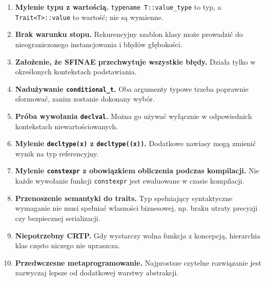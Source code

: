 \begin{enumerate}
\item \textbf{Mylenie typu z wartością.} \texttt{typename T::value\_type}
      to typ, a \texttt{Trait<T>::value} to wartość; nie są wymienne.
\item \textbf{Brak warunku stopu.} Rekurencyjny szablon klasy może
      prowadzić do nieograniczonego instancjowania i błędów głębokości.
\item \textbf{Założenie, że SFINAE przechwytuje wszystkie błędy.}
      Działa tylko w określonych kontekstach podstawiania.
\item \textbf{Nadużywanie \texttt{conditional\_t}.} Oba argumenty
      typowe trzeba poprawnie sformować, zanim zostanie dokonany wybór.
\item \textbf{Próba wywołania \texttt{declval}.} Można go używać wyłącznie
      w odpowiednich kontekstach niewartościowanych.
\item \textbf{Mylenie \texttt{decltype(x)} z \texttt{decltype((x))}.}
      Dodatkowe nawiasy mogą zmienić wynik na typ referencyjny.
\item \textbf{Mylenie \texttt{constexpr} z obowiązkiem obliczenia
      podczas kompilacji.} Nie każde wywołanie funkcji \texttt{constexpr}
      jest ewaluowane w czasie kompilacji.
\item \textbf{Przenoszenie semantyki do traits.} Typ spełniający
      syntaktyczne wymaganie nie musi spełniać własności biznesowej,
      np. braku utraty precyzji czy bezpiecznej serializacji.
\item \textbf{Niepotrzebny CRTP.} Gdy wystarczy wolna funkcja
      z koncepcją, hierarchia klas często niczego nie upraszcza.
\item \textbf{Przedwczesne metaprogramowanie.} Najprostsze czytelne
      rozwiązanie jest zazwyczaj lepsze od dodatkowej warstwy abstrakcji.
\end{enumerate}

